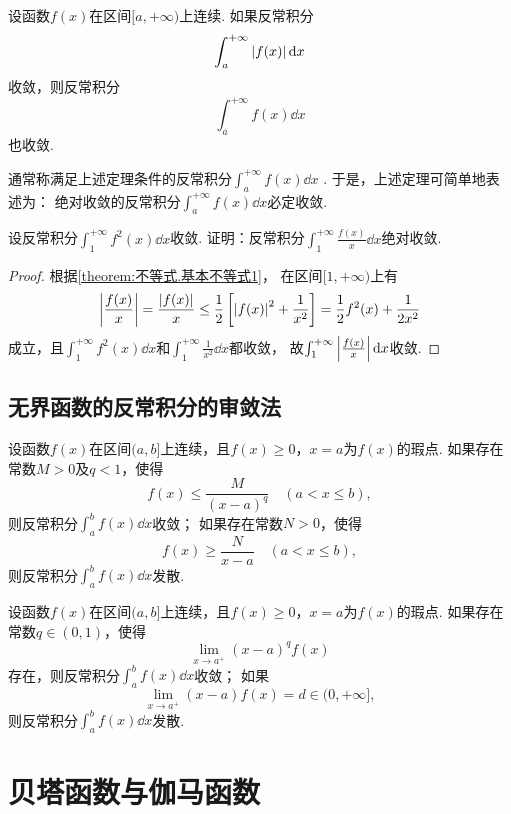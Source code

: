 \begin{theorem}\label{theorem:定积分.绝对收敛的无穷限反常积分必收敛}
设函数\(f(x)\)在区间\([a,+\infty)\)上连续.
如果反常积分\[
\int_a^{+\infty} \abs{f(x)} \dd{x}
\]收敛，则反常积分\[
\int_a^{+\infty} f(x) \dd{x}
\]也收敛.
\end{theorem}
通常称满足上述定理条件的反常积分\(\int_a^{+\infty} f(x) \dd{x}\) .
于是，上述定理可简单地表述为：
绝对收敛的反常积分\(\int_a^{+\infty} f(x) \dd{x}\)必定收敛.

\begin{example}
设反常积分\(\int_1^{+\infty} f^2(x) \dd{x}\)收敛.
证明：反常积分\(\int_1^{+\infty} \frac{f(x)}{x} \dd{x}\)绝对收敛.
\begin{proof}
根据\cref{theorem:不等式.基本不等式1}，
在区间\([1,+\infty)\)上有\[
\abs{\frac{f(x)}{x}}
= \frac{\abs{f(x)}}{x}
\leq \frac{1}{2} \left[
	\abs{f(x)}^2 + \frac{1}{x^2}
\right]
= \frac{1}{2} f^2(x) + \frac{1}{2x^2}
\]成立，且\(\int_1^{+\infty} f^2(x) \dd{x}\)和\(\int_1^{+\infty} \frac{1}{x^2} \dd{x}\)都收敛，
故\(\int_1^{+\infty} \abs{\frac{f(x)}{x}} \dd{x}\)收敛.
\end{proof}
\end{example}

\subsection{无界函数的反常积分的审敛法}
\begin{theorem}[比较审敛法]\label{theorem:定积分.无界函数的反常积分的比较审敛法}
设函数\(f(x)\)在区间\((a,b]\)上连续，且\(f(x) \geq 0\)，\(x=a\)为\(f(x)\)的瑕点.
如果存在常数\(M > 0\)及\(q < 1\)，使得\[
f(x) \leq \frac{M}{(x-a)^q} \quad (a < x \leq b),
\]则反常积分\(\int_a^b f(x) \dd{x}\)收敛；
如果存在常数\(N > 0\)，使得\[
f(x) \geq \frac{N}{x - a} \quad (a < x \leq b),
\]则反常积分\(\int_a^b f(x) \dd{x}\)发散.
\end{theorem}

\begin{theorem}[极限审敛法]\label{theorem:定积分.无界函数的反常积分的极限审敛法}
设函数\(f(x)\)在区间\((a,b]\)上连续，且\(f(x) \geq 0\)，\(x=a\)为\(f(x)\)的瑕点.
如果存在常数\(q \in (0,1)\)，使得\[
\lim_{x \to a^+} (x-a)^q f(x)
\]存在，则反常积分\(\int_a^b f(x) \dd{x}\)收敛；
如果\[
\lim_{x \to a^+} (x-a) f(x) = d \in (0,+\infty],
\]则反常积分\(\int_a^b f(x) \dd{x}\)发散.
\end{theorem}

\section{贝塔函数与伽马函数}

